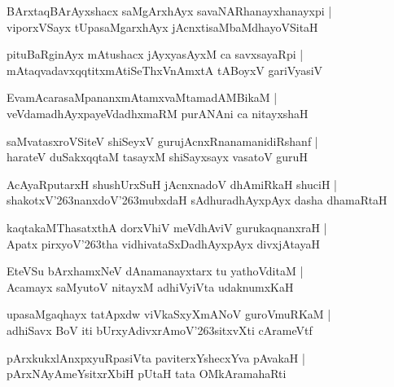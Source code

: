 \documentclass[twoside,12pt,openright]{book}
\def\S{\char'263}
\newcounter{shloka}[chapter]
\begin{document}
\begin{shloka}
BArxtaqBArAyxshacx saMgArxhAyx savaNARhanayxhanayxpi |\\
viporxVSayx tUpasaMgarxhAyx jAcnxtisaMbaMdhayoVSitaH 
\end{shloka}

\begin{shloka}
pituBaRginAyx mAtushacx jAyxyasAyxM  ca savxsayaRpi |\\
mAtaqvadavxqqtitxmAtiSeThxVnAmxtA tABoyxV gariVyasiV 
\end{shloka}

\begin{shloka}
EvamAcarasaMpananxmAtamxvaMtamadAMBikaM |\\
veVdamadhAyxpayeVdadhxmaRM purANAni ca nitayxshaH 
\end{shloka}

\begin{shloka}
saMvatasxroVSiteV shiSeyxV gurujAcnxRnanamanidiRshanf |\\
harateV duSakxqqtaM tasayxM shiSayxsayx vasatoV guruH
\end{shloka}

\begin{shloka}
AcAyaRputarxH shushUrxSuH jAcnxnadoV dhAmiRkaH shuciH |\\
shakotxV\S nanxdoV\S mubxdaH sAdhuradhAyxpAyx dasha dhamaRtaH 
\end{shloka}

\begin{shloka}
kaqtakaMThasatxthA dorxVhiV meVdhAviV gurukaqnanxraH |\\
Apatx pirxyoV\S tha vidhivataSxDadhAyxpAyx divxjAtayaH
\end{shloka}

\begin{shloka}
EteVSu bArxhamxNeV dAnamanayxtarx tu yathoVditaM |\\
Acamayx saMyutoV nitayxM adhiVyiVta udaknumxKaH 
\end{shloka}

\begin{shloka}
upasaMgaqhayx tatApxdw viVkaSxyXmANoV guroVmuRKaM |\\
adhiSavx BoV iti bUrxyAdivxrAmoV\S sitxvXti cArameVtf
\end{shloka}

\begin{shloka}
pArxkukxlAnxpxyuRpasiVta paviterxYshecxYva pAvakaH |\\
pArxNAyAmeYsitxrXbiH pUtaH tata OMkAramahaRti 
\end{shloka}
\end{document}
